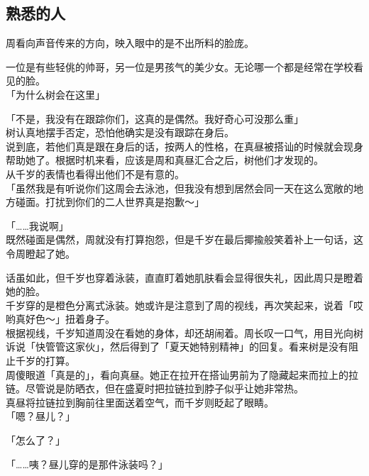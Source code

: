 \subsection{熟悉的人}

周看向声音传来的方向，映入眼中的是不出所料的脸庞。

一位是有些轻佻的帅哥，另一位是男孩气的美少女。无论哪一个都是经常在学校看见的脸。\\

「为什么树会在这里」

「不是，我没有在跟踪你们，这真的是偶然。我好奇心可没那么重」\\

树认真地摆手否定，恐怕他确实是没有跟踪在身后。\\

说到底，若他们真是跟在身后的话，按两人的性格，在真昼被搭讪的时候就会现身帮助她了。根据时机来看，应该是周和真昼汇合之后，树他们才发现的。\\

从千岁的表情也看得出他们不是有意的。\\

「虽然我是有听说你们这周会去泳池，但我没有想到居然会同一天在这么宽敞的地方碰面。打扰到你们的二人世界真是抱歉～」

「……我说啊」\\

既然碰面是偶然，周就没有打算抱怨，但是千岁在最后揶揄般笑着补上一句话，这令周瞪起了她。

话虽如此，但千岁也穿着泳装，直直盯着她肌肤看会显得很失礼，因此周只是瞪着她的脸。\\

千岁穿的是橙色分离式泳装。她或许是注意到了周的视线，再次笑起来，说着「哎哟真好色～」扭着身子。\\

根据视线，千岁知道周没在看她的身体，却还胡闹着。周长叹一口气，用目光向树诉说「快管管这家伙」，然后得到了「夏天她特别精神」的回复。看来树是没有阻止千岁的打算。\\

周傻眼道「真是的」，看向真昼。她正在拉开在搭讪男前为了隐藏起来而拉上的拉链。尽管说是防晒衣，但在盛夏时把拉链拉到脖子似乎让她非常热。\\

真昼将拉链拉到胸前往里面送着空气，而千岁则眨起了眼睛。\\

「嗯？昼儿？」

「怎么了？」

「……咦？昼儿穿的是那件泳装吗？」

